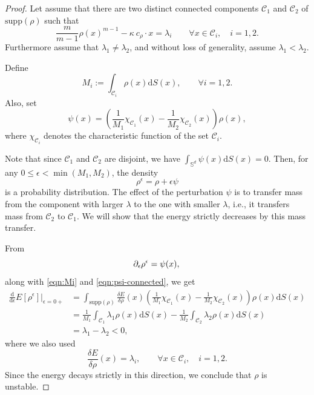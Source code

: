 \documentclass[11pt]{amsart}
\newcommand{\bbs}{\mathbb S}
\def\d{\mathrm{d}}
\newcommand{\dx}{\mathrm{d}S (x)}
\newcommand{\supp}{\mathrm{supp}(\rho)}
\newcommand{\dm}{d} %
\begin{document}
\begin{proof}
Let assume that there are two distinct connected components $\mathcal{C}_1$ and $\mathcal{C}_2$ of $\supp$ such that
\[
\frac{m}{m-1}\rho(x)^{m-1}-\kappa~ c_\rho\cdot x=\lambda_i
\qquad
\forall x\in\mathcal{C}_i,\quad i=1, 2.
\]
Furthermore assume that $\lambda_1\neq \lambda_2$, and without loss of generality, assume $\lambda_1<\lambda_2$. 

Define
\begin{equation}
\label{eqn:Mi}
M_i:=\int_{\mathcal{C}_i}\rho(x)\dx, \qquad\forall i=1, 2.
\end{equation}
Also, set 
\begin{equation}
\label{eqn:psi-connected}
\psi(x)=\left(\frac{1}{M_1}\chi_{\mathcal{C}_1}(x)-\frac{1}{M_2}\chi_{\mathcal{C}_2}(x)\right)\rho(x),
\end{equation}
where $\chi_{\mathcal{C}_i}$ denotes the characteristic function of the set $\mathcal{C}_i$. 

Note that since $\mathcal{C}_1$ and $\mathcal{C}_2$ are disjoint, we have $\int_{\bbs^\dm} \psi(x) \dx =0$. Then, for any $0\leq \epsilon<\min(M_1, M_2)$, the density
\[
\rho^\epsilon=\rho+\epsilon\psi
\]
is a probability distribution. The effect of the perturbation $\psi$ is to transfer mass from the component with larger $\lambda$ to the one with smaller $\lambda$, i.e., it transfers mass from $\mathcal{C}_2$ to $\mathcal{C}_1$. We will show that the energy strictly decreases by this mass transfer.

From
\[
\partial_\epsilon\rho^\epsilon=\psi(x), \\
\]
along with \eqref{eqn:Mi} and \eqref{eqn:psi-connected}, we get
\begin{align*}
\frac{\d}{\d\epsilon}E[\rho^\epsilon]\bigg|_{\epsilon=0+}&=\int_{\supp}\frac{\delta E}{\delta\rho}(x) \left(\frac{1}{M_1}\chi_{\mathcal{C}_1}(x)-\frac{1}{M_2}\chi_{\mathcal{C}_2}(x)\right)\rho(x)\dx\\[3pt]
&=\frac{1}{M_1}\int_{\mathcal{C}_1}\lambda_1\rho(x)\dx-\frac{1}{M_2}\int_{\mathcal{C}_2}\lambda_2\rho(x)\dx\\[3pt]
&=\lambda_1-\lambda_2<0,
\end{align*}
where we also used
\[
\frac{\delta E}{\delta \rho}(x)=\lambda_i, \qquad\forall x\in \mathcal{C}_i, \quad i=1, 2.
\]
Since the energy decays strictly in this direction, we  conclude that $\rho$ is unstable.
\end{proof}
\end{document}
